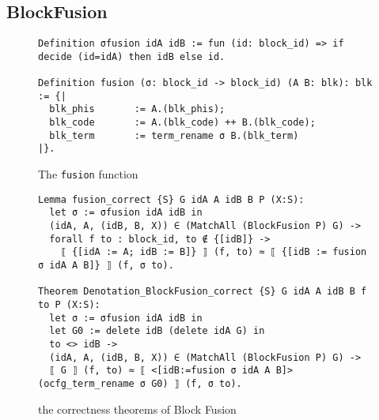 \documentclass{beamer}
\newcommand{\inlinecoq}[1]{\mbox{\lstinline[style=customcoq,columns=fixed,basewidth=.48em]{#1}}}
\newcommand{\ilc}[1]{\inlinecoq{#1}}
\begin{document}
\subsection*{BlockFusion}



\begin{frame}[fragile]
  \begin{figure}
    \begin{lstlisting}[style=customcoq,basicstyle=\small\ttfamily]
Definition σfusion idA idB := fun (id: block_id) => if decide (id=idA) then idB else id.

Definition fusion (σ: block_id -> block_id) (A B: blk): blk := {|
  blk_phis       := A.(blk_phis);
  blk_code       := A.(blk_code) ++ B.(blk_code);
  blk_term       := term_rename σ B.(blk_term)
|}.
    \end{lstlisting}
    \caption{The \ilc{fusion} function}
    \label{fig:fusion}
  \end{figure}
\end{frame}

\begin{frame}[fragile]
  \begin{figure}
    \begin{lstlisting}[style=customcoq,basicstyle=\small\ttfamily]
Lemma fusion_correct {S} G idA A idB B P (X:S):
  let σ := σfusion idA idB in
  (idA, A, (idB, B, X)) ∈ (MatchAll (BlockFusion P) G) ->
  forall f to : block_id, to ∉ {[idB]} ->
    ⟦ {[idA := A; idB := B]} ⟧ (f, to) ≈ ⟦ {[idB := fusion σ idA A B]} ⟧ (f, σ to).

Theorem Denotation_BlockFusion_correct {S} G idA A idB B f to P (X:S):
  let σ := σfusion idA idB in
  let G0 := delete idB (delete idA G) in
  to <> idB ->
  (idA, A, (idB, B, X)) ∈ (MatchAll (BlockFusion P) G) ->
  ⟦ G ⟧ (f, to) ≈ ⟦ <[idB:=fusion σ idA A B]> (ocfg_term_rename σ G0) ⟧ (f, σ to).
        \end{lstlisting}
    \caption{the correctness theorems of Block Fusion}
    \label{fig:fusion_proof}
  \end{figure}
\end{frame}
\end{document}
